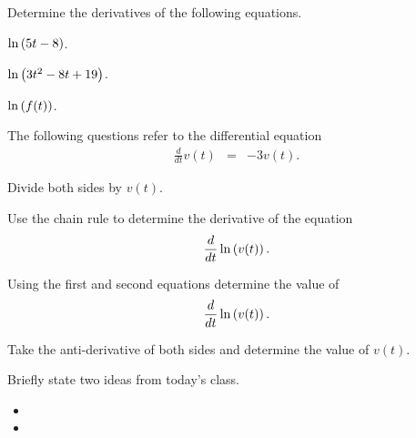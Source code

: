 \begin{problem}
\item Determine the derivatives of the following equations.
  \begin{subproblem}
    \item $\ln\left( 5t-8\right)$.
      \vfill
    \item $\ln\left( 3t^2 - 8t + 19 \right)$.
      \vfill
    \item $\ln\left( f(t) \right)$.
      \vfill
  \end{subproblem}

  \clearpage

\item The following questions refer to the differential equation
  \begin{eqnarray*}
    \frac{d}{dt} v(t) & = & -3 v(t).
  \end{eqnarray*}
  \begin{subproblem}
  \item Divide both sides by $v(t)$.
    \vfill
  \item Use the chain rule to determine the derivative of the equation
    \begin{eqnarray*}
      \frac{d}{dt} \ln\left( v(t) \right).
    \end{eqnarray*}
    \vfill
  \item Using the first and second equations determine the value of 
    \begin{eqnarray*}
      \frac{d}{dt} \ln\left( v(t) \right).
    \end{eqnarray*}
    \vfill
  \item Take the anti-derivative of both sides and determine the value
    of $v(t)$.
    \vfill
  \end{subproblem}

\end{problem}

\postClass

\begin{problem}
\item Briefly state two ideas from today's class.
  \begin{itemize}
  \item 
  \item 
  \end{itemize}
\item 
  \begin{subproblem}
    \item
  \end{subproblem}
\end{problem}



